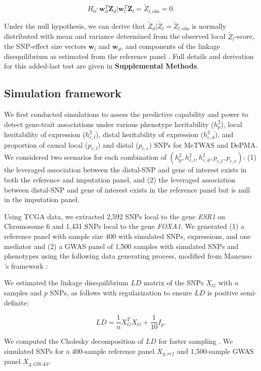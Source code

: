 $$H_0: \mathbf{w}_d^T\mathbf{Z}_d | \mathbf{w}_l^T\mathbf{Z}_l = \tilde{Z}_{l,\text{obs}} = 0.$$

\noindent Under the null hypothesis,
we can derive that 
$\tilde{Z}_d|\tilde{Z}_l = \tilde{Z}_{l,\text{obs}}$
is normally distributed
with mean and variance
determined from the observed
local $\tilde{Z}_l$-score,
the SNP-effect size
vectors $\mathbf{w}_l$
and $\mathbf{w}_d$,
and components of the linkage
disequilibrium as estimated
from the reference panel \cite{Pasaniuc2014FastEnrichment}.
Full details and derivation
for this added-last test
are given in \textbf{Supplemental
Methods}.

\subsection{Simulation framework}

We first conducted simulations to assess
the predictive capability
and power to detect
gene-trait associations
under various phenotype heritability ($h^2_p$),
local heritability of expression ($h^2_{e,l}$),
distal heritability of expression ($h^2_{e,d}$),
and proportion of causal local ($p_{c,l}$)
and distal ($p_{c,e}$) SNPs
for MeTWAS and DePMA.
We considered two scenarios for each
combination of $(h^2_p, h^2_{e,l}, h^2_{e,d}, p_{c,l},
p_{c,e})$: (1) the leveraged association
between the distal-SNP and gene of interest
exists in both the reference
and imputation panel, and (2) the leveraged association 
between distal-SNP and gene of interest
exists in the reference panel but is null
in the imputation panel.

Using TCGA data, we 
extracted 2,592 SNPs local to
the gene \emph{ESR1} 
on Chromosome 6 and 1,431 SNPs
local to the gene \emph{FOXA1}.
We generated (1) a reference panel with sample
size 400 with
simulated SNPs, expressions,
and one mediator
and (2) a GWAS panel of
1,500 samples with simulated SNPs
and phenotypes using the following data
generating process, modified
from Mancuso \etal{}'s framework
\cite{Mancuso2019ProbabilisticStudies}:

We estimated the linkage disequilibrium $LD$
matrix of the SNPs $X_G$ with $n$
samples and $p$ SNPs, as follows
with regularization to ensure $LD$ is positive semi-definite:

$$LD = \frac{1}{n}X_G^TX_G + \frac{1}{10}I_p.$$ 

\noindent We computed the Cholesky decomposition of
$LD$ for faster sampling
\cite{Mancuso2019ProbabilisticStudies}.
We simulated SNPs for a 400-sample
reference panel $X_{g,ref}$ and 
1,500-sample GWAS panel $X_{g,GWAS}$.

